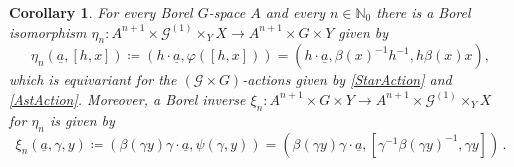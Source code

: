 \documentclass[11pt, oneside]{amsart}
\newtheorem{cor}[lemma]{Corollary}
\theoremstyle{definition}
\theoremstyle{remark}
\theoremstyle{TheoremNum}
\newcommand{\cG}{\mathcal{G}}
\begin{document}
\begin{cor}\label{IncludeS} For every Borel $G$-space $A$ and every $n \in \mathbb N_0$ there is a Borel isomorphism
$\eta_{n}: A^{n+1}\times \mathcal{G}^{(1)}\times_Y X \to A^{n+1}\times G\times Y$ given by 
\begin{equation}\label{Defetan}
\eta_{n}(\underline{a}, [h,x])\coloneqq  (h \cdot \underline{a}, \varphi([h,x]))= (h\cdot \underline{a},\beta(x)^{-1} h^{-1},h\beta(x)x),
\end{equation}
which is equivariant for the  $(\cG \times G)$-actions given by \eqref{StarAction} and \eqref{AstAction}.
Moreover, a Borel inverse 
$\xi_n: A^{n+1}\times G\times Y  \to    A^{n+1}\times \mathcal{G}^{(1)}\times_Y X$  for $\eta_n$ is given by
\begin{equation}\label{Defxin}
  \xi_n(\underline{a},\gamma,y)\coloneqq (\beta(\gamma y)\gamma\cdot \underline{a},\psi(\gamma,y)) =(\beta(\gamma y)\gamma \cdot \underline{a},[\gamma^{-1}\beta(\gamma y)^{-1},\gamma y])\,.
\end{equation}
\end{cor}
\end{document}
